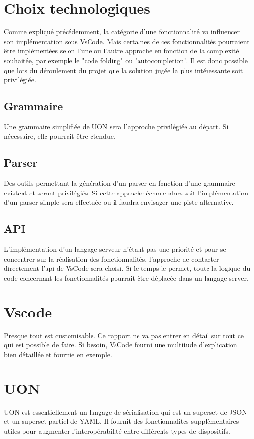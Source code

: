 \documentclass[
    iict, %
    il, %
]{heig-tb}
\begin{document}
\section{Choix technologiques}
Comme expliqué précédemment, la catégorie d'une fonctionnalité va influencer son implémentation sous VsCode. Mais certaines de ces fonctionnalités pourraient être implémentées selon l'une ou l'autre approche en fonction de la complexité souhaitée, par exemple le  "code folding" ou "autocompletion". Il est donc possible que lors du déroulement du projet que la solution jugée la plus intéressante soit privilégiée.

\subsection{Grammaire}
Une grammaire simplifiée de UON sera l'approche privilégiée au départ. Si nécessaire, elle pourrait être étendue.

\subsection{Parser}
Des outils permettant la génération d'un parser en fonction d'une grammaire existent et seront privilégiés. Si cette approche échoue alors soit l'implémentation d'un parser simple sera effectuée ou il faudra envisager une piste alternative.

\subsection{API}
L'implémentation d'un langage serveur n'étant pas une priorité et pour se concentrer sur la réalisation des fonctionnalités, l'approche de contacter directement l'api de VsCode sera choisi. Si le temps le permet, toute la logique du code concernant les fonctionnalités pourrait être déplacée dans un langage server. 

\section{Vscode}
Presque tout est customisable. Ce rapport ne va pas entrer en détail sur tout ce qui est possible de faire. Si besoin, VsCode fourni une multitude d'explication bien détaillée et fournie en exemple.

\section{UON}
UON est essentiellement un langage de sérialisation qui est un superset de JSON et un superset partiel de YAML. Il fournit des fonctionnalités supplémentaires utiles pour augmenter l'interopérabilité entre différents types de dispositifs.
\end{document}
